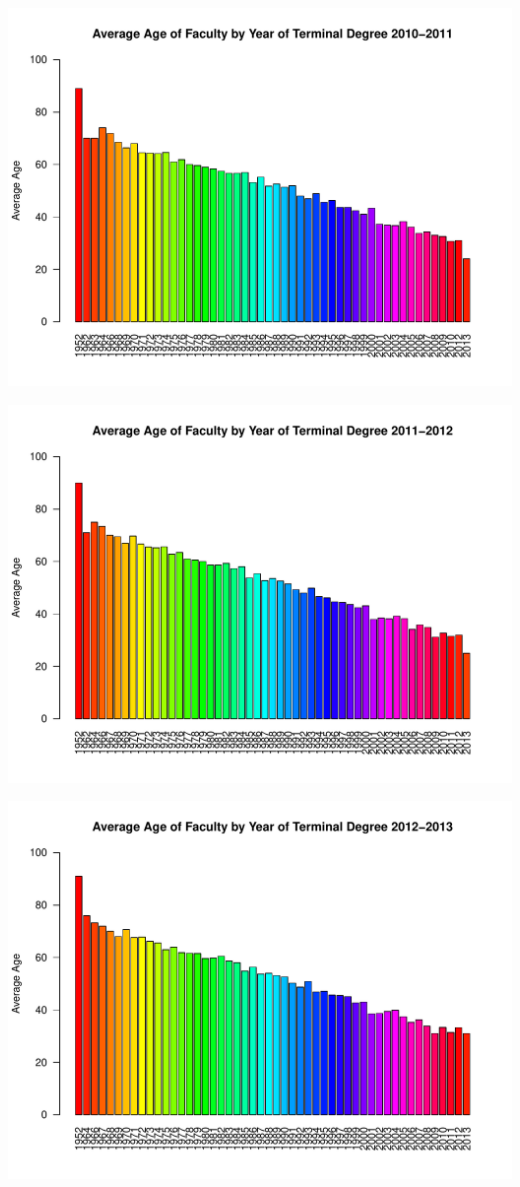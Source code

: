 \documentclass[12pt,a4paper]{article}\usepackage[]{graphicx}\usepackage[]{color}
\makeatletter
\def\maxwidth{ %
  \ifdim\Gin@nat@width>\linewidth
    \linewidth
  \else
    \Gin@nat@width
  \fi
}
\newenvironment{knitrout}{}{} %
\theoremstyle{definition}
\makeatother
\begin{document}
\begin{knitrout}
\includegraphics[width=\maxwidth]{figure/unnamed-chunk-12-7} 

\includegraphics[width=\maxwidth]{figure/unnamed-chunk-12-8} 

\includegraphics[width=\maxwidth]{figure/unnamed-chunk-12-9} 


\end{knitrout}
\end{document}

